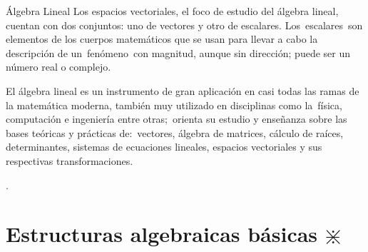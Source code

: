 \begin{myexampleblock}{Álgebra Lineal}
\vspace{2mm} Los espacios vectoriales, el foco de estudio del álgebra lineal, cuentan con dos conjuntos: uno de vectores y otro de escalares. Los escalares son elementos de los cuerpos matemáticos que se usan para llevar a cabo la descripción de un fenómeno con magnitud, aunque sin dirección; puede ser un número real o complejo.

\vspace{2mm} El álgebra lineal es un instrumento de gran aplicación en casi todas las ramas de la matemática moderna, también muy utilizado en disciplinas como la física, computación e ingeniería entre otras; orienta su estudio y enseñanza sobre las bases teóricas y prácticas de: vectores, álgebra de matrices, cálculo de raíces, determinantes, sistemas de ecuaciones lineales, espacios vectoriales y sus respectivas transformaciones. 

\vspace{2mm} 
.
	
\end{myexampleblock}




\chapter{Estructuras algebraicas básicas $\divideontimes$} \label{e_alg}	
